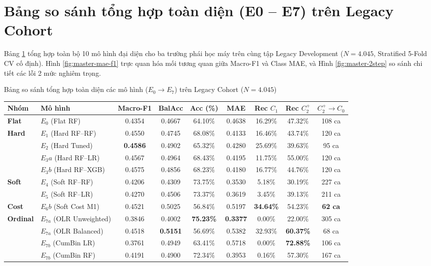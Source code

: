 \section{Bảng so sánh tổng hợp toàn diện (E0 -- E7) trên Legacy Cohort}
\label{sec:so-sanh-tong-hop-e0-e7}

Bảng \ref{tab:master-comparison} tổng hợp toàn bộ 10 mô hình đại diện cho ba trường phái học máy trên cùng tập Legacy Development ($N = 4.045$, Stratified 5-Fold CV cố định). Hình \ref{fig:master-mae-f1} trực quan hóa mối tương quan giữa Macro-F1 và Class MAE, và Hình \ref{fig:master-2step} so sánh chi tiết các lỗi 2 mức nghiêm trọng.

\begin{table}{Bảng so sánh tổng hợp toàn diện các mô hình ($E_0 \to E_7$) trên Legacy Cohort ($N = 4.045$)}
\centering
\small
\label{tab:master-comparison}
\begin{tabularx}{\textwidth}{l p{3.2cm} c c c c c c c}
\toprule
\textbf{Nhóm} & \textbf{Mô hình} & \textbf{Macro-F1} & \textbf{BalAcc} & \textbf{Acc (\%)} & \textbf{MAE} & \textbf{Rec $C_1$} & \textbf{Rec $C_2^+$} & \textbf{$C_2^+ \to C_0$} \\
\midrule
\textbf{Flat} & $E_0$ (Flat RF) & 0.4354 & 0.4667 & 64.10\% & 0.4638 & 16.29\% & 47.32\% & 108 ca \\
\midrule
\multirow{4}{*}{\textbf{Hard}} 
  & $E_1$ (Hard RF--RF) & 0.4550 & 0.4745 & 68.08\% & 0.4133 & 16.46\% & 43.74\% & 120 ca \\
  & $E_2$ (Hard Tuned)  & \textbf{0.4586} & 0.4902 & 65.32\% & 0.4280 & 25.69\% & 39.63\% & 95 ca \\
  & $E_3a$ (Hard RF--LR)& 0.4567 & 0.4964 & 68.43\% & 0.4195 & 11.75\% & 55.00\% & 120 ca \\
  & $E_3b$ (Hard RF--XGB)& 0.4575 & 0.4856 & 68.23\% & 0.4180 & 16.77\% & 44.76\% & 120 ca \\
\midrule
\multirow{2}{*}{\textbf{Soft}} 
  & $E_4$ (Soft RF--RF) & 0.4206 & 0.4309 & 73.75\% & 0.3530 & 5.18\% & 30.19\% & 227 ca \\
  & $E_5$ (Soft RF--LR) & 0.4270 & 0.4506 & 73.37\% & 0.3619 & 3.45\% & 39.13\% & 211 ca \\
\midrule
\textbf{Cost} & $E_6b$ (Soft Cost M1) & 0.4521 & 0.5025 & 56.84\% & 0.5197 & \textbf{34.64\%} & 54.23\% & \textbf{62 ca} \\
\midrule
\multirow{4}{*}{\textbf{Ordinal}} 
  & $E_{7a}$ (OLR Unweighted)& 0.3846 & 0.4002 & \textbf{75.23\%} & \textbf{0.3377} & 0.00\% & 22.00\% & 305 ca \\
  & $E_{7a}$ (OLR Balanced)  & 0.4518 & \textbf{0.5151} & 56.69\% & 0.5382 & 32.93\% & \textbf{60.37\%} & 68 ca \\
  & $E_{7b}$ (CumBin LR)     & 0.3761 & 0.4949 & 63.41\% & 0.5718 & 0.00\% & \textbf{72.88\%} & 106 ca \\
  & $E_{7b}$ (CumBin RF)     & 0.4191 & 0.4900 & 72.34\% & 0.3953 & 0.16\% & 57.30\% & 167 ca \\
\bottomrule
\end{tabularx}
\end{table}

